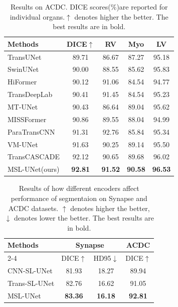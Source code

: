 \documentclass[10pt, a4paper, twocolumn]{article}
\begin{document}
\begin{table}
\footnotesize
\centering
\begin{tabular}{l|c|ccc}\hline
Methods & DICE$\uparrow$  &RV &Myo& LV\\\hline
TransUNet\cite{chen2021transunet} & 89.71& 86.67& 87.27& 95.18 \\
SwinUNet\cite{cao2021swinunet} & 90.00& 88.55& 85.62& 95.83 \\
HiFormer\cite{heidari2023hiformer} & 90.12& 91.06& 84.54& 94.77 \\
TransDeepLab\cite{azad2022transdeeplab} & 90.41& 91.45& 84.54& 95.23 \\
MT-UNet\cite{wang2022mixed} & 90.43& 86.64& 89.04& 95.62 \\
MISSFormer\cite{huang2022missformer} & 90.86& 89.55& 88.04& 94.99 \\
ParaTransCNN\cite{sun2024paratranscnn} & 91.31& 92.76& 85.84& 95.34 \\
VM-UNet\cite{ruan2024vmunet} & 91.63& 90.25& 89.14& 95.50 \\
TransCASCADE\cite{rahman2023transcascade} & 92.12& 90.65& 89.68& 96.02 \\
\hline
MSL-UNet(ours) & \textbf{92.81} & \textbf{91.52} & \textbf{90.58} &\textbf{96.53} \\\hline
\end{tabular}
\caption{Results on ACDC. DICE scores($\%$)are reported for individual organs.$\uparrow$ denotes higher the better. The best results are in bold.}
\end{table}


\begin{table}
\small
\centering
\begin{tabular}{l|cc|c}\hline
\multirow{2}{*}{Methods} & \multicolumn{2}{c|}{Synapse} & ACDC \\\cline{2-4}
& DICE$\uparrow$ & HD95$\downarrow$ & DICE$\uparrow$ \\\hline
CNN-SL-UNet & 81.93 &18.27& 89.94\\
Trans-SL-UNet & 82.76 & 16.62 & 91.05\\\hline
MSL-UNet & \textbf{83.36} & \textbf{16.18} & \textbf{92.81} \\\hline
\end{tabular}
\caption{Results of how different encoders affect performance of segmentaion on Synapse and ACDC datasets. $\uparrow$ denotes higher the better, $\downarrow$ denotes lower the better. The best results are in bold.}
\end{table}
\end{document}
